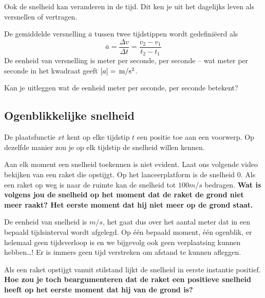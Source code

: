\documentclass{ximera}
\begin{document}
Ook de snelheid kan veranderen in de tijd. Dit ken je uit het dagelijks leven als versnellen of vertragen.

\begin{definition}

De gemiddelde versnelling \(\overline{a}\) tussen twee tijdstippen wordt gedefiniëerd als
\[
\overline{a}=\frac{\Delta v}{\Delta t}=\frac{v_2-v_1}{t_2-t_1}
\]
De eenheid van versnelling is meter per seconde, per seconde -- wat meter per seconde in het kwadraat geeft $[a]=\rm\,m/s^2$.
\end{definition}

\begin{denkvraag*}{}
Kan je uitleggen wat de eenheid meter per seconde, per seconde betekent? 
\end{denkvraag*}

\subsection*{Ogenblikkelijke snelheid}

De plaatsfunctie \(x{t}\) kent op elke tijdstip \(t\) een positie toe aan een voorwerp. Op dezelfde manier zou je op elk tijdstip de snelheid willen kennen. 

\begin{denkvraag*}{}
Aan elk moment een snelheid toekennen is niet evident. Laat ons volgende video bekijken van een raket die opstijgt. Op het lanceerplatform is de snelheid \(0\). Als een raket op weg is naar de ruimte kan de snelheid tot \(100 m/s \) bedragen. \textbf{Wat is volgens jou de snelheid op het moment dat de raket de grond niet meer raakt? Het eerste moment dat hij niet meer op de grond staat.}
\end{denkvraag*}

De eenheid van snelheid is \(m/s\), het gaat dus over het aantal meter dat in een bepaald tijds\-in\-ter\-val wordt afgelegd. Op \'e\'en bepaald moment, \'e\'en ogenblik, er helemaal geen tijdsverloop is en we bijgevolg ook geen verplaatsing kunnen hebben\ldots! Er is immers geen tijd verstreken om afstand te kunnen afleggen.

\begin{denkvraag*}{}
Als een raket opstijgt vanuit stilstand lijkt de snelheid in eerste instantie positief. \textbf{Hoe zou je toch beargumenteren dat de raket een positieve snelheid heeft op het eerste moment dat hij van de grond is?}

\end{denkvraag*}
\end{document}
